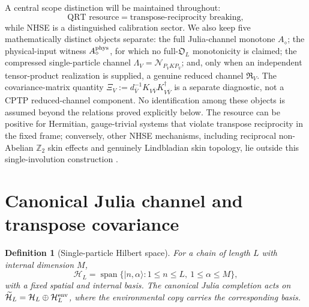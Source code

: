 \documentclass[reprint,amsmath,amssymb,aps,nofootinbib]{revtex4-2}
\newtheorem{definition}{Definition}
\newcommand{\FreeOps}{\mathfrak O}
\begin{document}
A central scope distinction will be maintained throughout:
\begin{equation}
\boxed{
\text{QRT resource}=\text{transpose-reciprocity breaking},
}
\end{equation}
while NHSE is a distinguished calibration sector. We also keep five mathematically distinct
objects separate: the full Julia-channel monotone $A_\diamond$; the physical-input witness
$A_\diamond^{\rm phys}$, for which no full-$\FreeOps_L$ monotonicity is claimed; the compressed
single-particle channel $\Lambda_V=\mathcal N_{P_VKP_V}$; and, only when an independent tensor-product
realization is supplied, a genuine reduced channel $\mathfrak R_V$. The covariance-matrix quantity
$\Xi_V:=d_{\bar V}^{-1}K_{V\bar V}K_{V\bar V}^\dagger$ is a separate diagnostic, not a CPTP
reduced-channel component. No identification among these objects is assumed beyond the relations proved explicitly below. The resource can be positive for Hermitian,
gauge-trivial systems that violate transpose reciprocity in the fixed frame; conversely, other
NHSE mechanisms, including reciprocal non-Abelian $\mathbb Z_2$ skin effects and genuinely
Lindbladian skin topology, lie outside this single-involution construction
\cite{OkumaEtAl2020,TangZ2Skin2026,ChaduteauLindblad2026}.

\section{Canonical Julia channel and transpose covariance}
\label{sec:channel}

\begin{definition}[Single-particle Hilbert space]
For a chain of length $L$ with internal dimension $M$,
\begin{equation}
\mathcal H_L=\operatorname{span}\{|n,\alpha\rangle:
1\le n\le L,\ 1\le\alpha\le M\},
\end{equation}
with a fixed spatial and internal basis. The canonical Julia completion acts on
$\widetilde{\mathcal H}_L=\mathcal H_L\oplus\mathcal H_L^{\rm env}$, where the environmental copy
carries the corresponding basis.
\end{definition}
\end{document}
